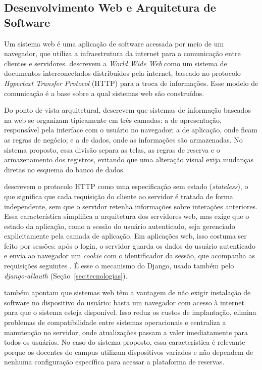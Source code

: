\subsection{Desenvolvimento Web e Arquitetura de Software}
\label{sec:web}

Um sistema web é uma aplicação de software acessada por meio de um navegador, que utiliza a infraestrutura da internet para a comunicação entre clientes e servidores.  descrevem a \textit{World Wide Web} como um sistema de documentos interconectados distribuídos pela internet, baseado no protocolo \textit{Hypertext Transfer Protocol} (HTTP) para a troca de informações. Esse modelo de comunicação é a base sobre a qual sistemas web são construídos.

Do ponto de vista arquitetural,  descrevem que sistemas de informação baseados na web se organizam tipicamente em três camadas: a de apresentação, responsável pela interface com o usuário no navegador; a de aplicação, onde ficam as regras de negócio; e a de dados, onde as informações são armazenadas. No sistema proposto, essa divisão separa as telas, as regras de reserva e o armazenamento dos registros, evitando que uma alteração visual exija mudanças diretas no esquema do banco de dados.

 descrevem o protocolo HTTP como uma especificação sem estado (\textit{stateless}), o que significa que cada requisição do cliente ao servidor é tratada de forma independente, sem que o servidor retenha informações sobre interações anteriores. Essa característica simplifica a arquitetura dos servidores web, mas exige que o estado da aplicação, como a sessão do usuário autenticado, seja gerenciado explicitamente pela camada de aplicação. Em aplicações web, isso costuma ser feito por sessões: após o login, o servidor guarda os dados do usuário autenticado e envia ao navegador um \textit{cookie} com o identificador da sessão, que acompanha as requisições seguintes \cite{djangodocs}. É esse o mecanismo do Django, usado também pelo \textit{django-allauth} (Seção~\ref{sec:tecnologias}).

 também apontam que sistemas web têm a vantagem de não exigir instalação de software no dispositivo do usuário: basta um navegador com acesso à internet para que o sistema esteja disponível. Isso reduz os custos de implantação, elimina problemas de compatibilidade entre sistemas operacionais e centraliza a manutenção no servidor, onde atualizações passam a valer imediatamente para todos os usuários. No caso do sistema proposto, essa característica é relevante porque os docentes do campus utilizam dispositivos variados e não dependem de nenhuma configuração específica para acessar a plataforma de reservas.

